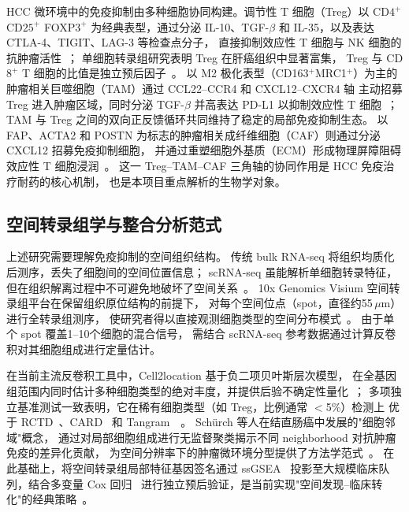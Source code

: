 \documentclass[12pt, a4paper]{ctexart}
\begin{document}
HCC 微环境中的免疫抑制由多种细胞协同构建。调节性 T 细胞（Treg）以 CD$4^+$CD$25^+$ FOXP$3^+$ 为经典表型，通过分泌 IL-10、TGF-$\beta$ 和 IL-35，以及表达 CTLA-4、TIGIT、LAG-3 等检查点分子，
直接抑制效应性 T 细胞与 NK 细胞的抗肿瘤活性~\citep{sakaguchi2020regulatory}；
单细胞转录组研究表明 Treg 在肝癌组织中显著富集，
Treg 与 CD$8^+$ T 细胞的比值是独立预后因子~\citep{zheng2017landscape}。
以 M2 极化表型（CD163$^+$MRC1$^+$）为主的肿瘤相关巨噬细胞（TAM）通过 CCL22--CCR4 和 CXCL12--CXCR4 轴
主动招募 Treg 进入肿瘤区域，同时分泌 TGF-$\beta$ 并高表达 PD-L1 以抑制效应性 T 细胞~\citep{biswas2010macrophage,noy2014tumor}；
TAM 与 Treg 之间的双向正反馈循环共同维持了稳定的局部免疫抑制生态。
以 FAP、ACTA2 和 POSTN 为标志的肿瘤相关成纤维细胞（CAF）则通过分泌 CXCL12 招募免疫抑制细胞，
并通过重塑细胞外基质（ECM）形成物理屏障阻碍效应性 T 细胞浸润~\citep{kalluri2016biology,mariathasan2018tgfb}。
这一 Treg--TAM--CAF 三角轴的协同作用是 HCC 免疫治疗耐药的核心机制，
也是本项目重点解析的生物学对象。

\subsection{空间转录组学与整合分析范式}

上述研究需要理解免疫抑制的空间组织结构。
传统 bulk RNA-seq 将组织均质化后测序，丢失了细胞间的空间位置信息；
scRNA-seq 虽能解析单细胞转录特征，但在组织解离过程中不可避免地破坏了空间关系~\citep{luecken2019current}。
10x Genomics Visium 空间转录组平台在保留组织原位结构的前提下，
对每个空间位点（spot，直径约55\,$\mu$m）进行全转录组测序，
使研究者得以直接观测细胞类型的空间分布模式~\citep{williams2022introduction}。
由于单个 spot 覆盖1--10个细胞的混合信号，
需结合 scRNA-seq 参考数据通过计算反卷积对其细胞组成进行定量估计。

在当前主流反卷积工具中，Cell2location 基于负二项贝叶斯层次模型，
在全基因组范围内同时估计多种细胞类型的绝对丰度，并提供后验不确定性量化~\citep{kleshchevnikov2022cell2location}；
多项独立基准测试一致表明，它在稀有细胞类型（如 Treg，比例通常 $<$5\%）检测上
优于 RCTD~\citep{cable2021robust}、CARD~\citep{ma2022integrative} 和 Tangram~\citep{biancalani2021deep}~\citep{li2022benchmarking,sang2023spotless,yan2023benchmarking}。
Schürch 等人在结直肠癌中发展的"细胞邻域"概念，
通过对局部细胞组成进行无监督聚类揭示不同 neighborhood 对抗肿瘤免疫的差异化贡献，
为空间分辨率下的肿瘤微环境分型提供了方法学范式~\citep{schurch2020coordinated}。
在此基础上，将空间转录组局部特征基因签名通过 ssGSEA~\citep{barbie2009systematic}
投影至大规模临床队列，结合多变量 Cox 回归~\citep{cox1972regression}
进行独立预后验证，是当前实现"空间发现--临床转化"的经典策略~\citep{hanzelmann2013gsva}。
\end{document}
